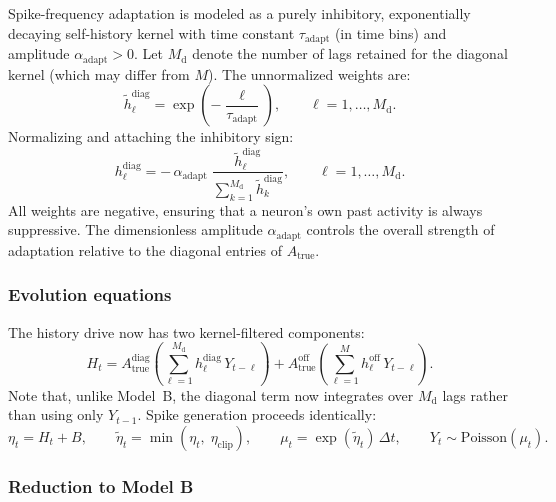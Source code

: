 \documentclass[11pt]{article}
\begin{document}
Spike-frequency adaptation is modeled as a purely inhibitory,
exponentially decaying self-history kernel with time constant
$\tau_{\mathrm{adapt}}$ (in time bins) and amplitude
$\alpha_{\mathrm{adapt}}>0$.
Let $M_{\mathrm{d}}$ denote the number of lags retained for the
diagonal kernel (which may differ from $M$).
The unnormalized weights are:
\begin{equation}
  \tilde{h}^{\mathrm{diag}}_\ell 
  = \exp\!\left(-\frac{\ell}{\tau_{\mathrm{adapt}}}\right),
  \qquad \ell = 1,\dots,M_{\mathrm{d}}.
  \label{eq:adapt_kernel_raw}
\end{equation}
Normalizing and attaching the inhibitory sign:
\begin{equation}
  h^{\mathrm{diag}}_\ell 
  = -\,\alpha_{\mathrm{adapt}}\;
    \frac{\tilde{h}^{\mathrm{diag}}_\ell} 
         {\sum_{k=1}^{M_{\mathrm{d}}}
          \tilde{h}^{\mathrm{diag}}_k}, 
  \qquad \ell = 1,\dots,M_{\mathrm{d}}.
  \label{eq:adapt_kernel}
\end{equation}
All weights are negative, ensuring that a neuron's own past
activity is always suppressive.
The dimensionless amplitude $\alpha_{\mathrm{adapt}}$ controls the
overall strength of adaptation relative to the diagonal entries of
$A_{\text{true}}$.

\subsubsection{Evolution equations}

The history drive now has two kernel-filtered components:
\begin{equation}
  H_t
  = A_{\text{true}}^{\mathrm{diag}}
    \!\left(\sum_{\ell=1}^{M_{\mathrm{d}}}
    h^{\mathrm{diag}}_\ell\,Y_{t-\ell}\right) 
  + A_{\text{true}}^{\mathrm{off}}
    \!\left(\sum_{\ell=1}^{M}
    h^{\mathrm{off}}_\ell\,Y_{t-\ell}\right). 
  \label{eq:histC}
\end{equation}
Note that, unlike Model~B, the diagonal term now integrates over
$M_{\mathrm{d}}$ lags rather than using only $Y_{t-1}$.
Spike generation proceeds identically:
\begin{equation}
  \eta_t = H_t + B,
  \qquad
  \tilde{\eta}_t = \min(\eta_t,\;\eta_{\mathrm{clip}}),
  \qquad
  \mu_t = \exp(\tilde{\eta}_t)\,\Delta t,
  \qquad
  Y_t \sim \mathrm{Poisson}(\mu_t).
  \label{eq:lagM_gen_C}
\end{equation}

\subsubsection{Reduction to Model B}
\end{document}
